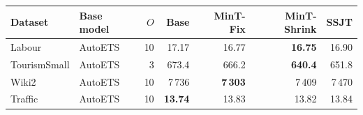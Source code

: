 \footnotesize
\begin{tabular}{l l r rrrr}
\toprule
Dataset & Base model & $O$ & Base & MinT-Fix & MinT-Shrink & SSJT\\
\midrule
Labour & AutoETS & 10 & 17.17 & 16.77 & \textbf{16.75} & 16.90\\
TourismSmall & AutoETS & 3 & 673.4 & 666.2 & \textbf{640.4} & 651.8\\
Wiki2 & AutoETS & 10 & 7\,736 & \textbf{7\,303} & 7\,409 & 7\,470\\
Traffic & AutoETS & 10 & \textbf{13.74} & 13.83 & 13.82 & 13.84\\
\bottomrule
\end{tabular}
